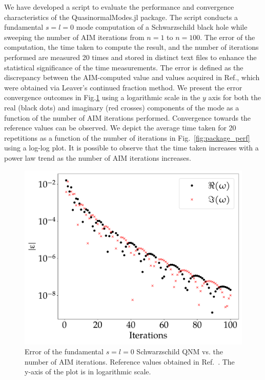 We have developed a script to evaluate the performance and convergence characteristics of the QuasinormalModes.jl package. The script conducts a fundamental $s=l=0$ mode computation of a Schwarzschild black hole while sweeping the number of \ac{AIM} iterations from $n=1$ to $n=100$. The error of the computation, the time taken to compute the result, and the number of iterations performed are measured 20 times and stored in distinct text files to enhance the statistical significance of the time measurements. The error is defined as the discrepancy between the \ac{AIM}-computed value and values acquired in Ref.\cite{BertiQNMData}, which were obtained via Leaver's continued fraction method. We present the error convergence outcomes in Fig.\ref{fig:package_error} using a logarithmic scale in the $y$ axis for both the real (black dots) and imaginary (red crosses) components of the mode as a function of the number of \ac{AIM} iterations performed. Convergence towards the reference values can be observed. We depict the average time taken for 20 repetitions as a function of the number of iterations in Fig.~\ref{fig:package_perf} using a log-log plot. It is possible to observe that the time taken increases with a power law trend as the number of \ac{AIM} iterations increases.

\begin{figure}[!ht]
  \centering
  \includegraphics[width=\linewidth]{img/aim_qnm/err.pdf}
  \caption{Error of the fundamental $s=l=0$ Schwarzschild \ac{QNM} vs. the number of \ac{AIM} iterations. Reference values obtained in Ref.~\cite{BertiQNMData}. The y-axis of the plot is in logarithmic scale.}
  \label{fig:package_error}
\end{figure}

